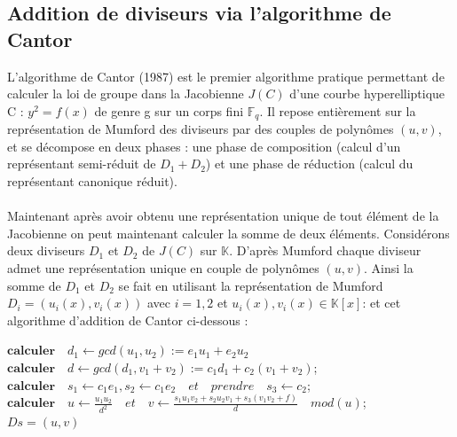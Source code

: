 \documentclass[12pt,a4paper]{article}
\begin{document}
	\subsection{Addition de diviseurs via l'algorithme de Cantor}
	L'algorithme de Cantor (1987) est le premier algorithme pratique permettant
	de calculer la loi de groupe dans la Jacobienne $J(C)$ d'une courbe hyperelliptique C :
	$y^2 = f(x)$ de genre g sur un corps fini $\mathbb{F}_q$. Il repose entièrement sur la représentation
	de Mumford des diviseurs par des couples de polynômes $(u, v)$, et se décompose en
	deux phases : une phase de composition (calcul d'un représentant semi-réduit de
	$D_1 + D_2$) et une phase de réduction (calcul du représentant canonique réduit).
	
	\paragraph*{}
	Maintenant après avoir obtenu une représentation unique de tout élément de la Jacobienne on peut maintenant calculer la somme de deux éléments.
	Considérons deux diviseurs $D_1$ et $D_2$ de $J(C)$ sur $\mathbb{K}$. D'après Mumford chaque diviseur admet une représentation unique en couple de polynômes $(u,v)$.  
	Ainsi la somme de $D_1$ et $D_2$ se fait en utilisant la représentation de Mumford $D_i = (u_i(x),v_i(x))$ avec $i=1,2$ et $u_i(x), v_i(x) \in \mathbb{K}[x]$: et cet algorithme d'addition de Cantor ci-dessous :
	\vspace{0.5cm}
	
	
	\begin{algorithm}[H] 
		\caption{Algorithme d'addition de Cantor}
		\label{alg:cantor}
			
		$\textbf{calculer}\quad d_1 \leftarrow gcd(u_1,u_2):= e_1u_1 + e_2u_2$\;
		$\textbf{calculer}\quad d \leftarrow gcd(d_1,v_1 + v_2):=c_1d_1 +c_2(v_1+v_2)$;\\
		$\textbf{calculer}\quad s_1 \leftarrow c_1e_1, s_2 \leftarrow c_1e_2 \quad et\quad prendre\quad s_3 \leftarrow c_2$;\\
		$\textbf{calculer}\quad u \leftarrow \frac{u_1u_2}{d^2}\quad et \quad v \leftarrow \frac{s_1u_1v_2 + s_2u_2v_1 + s_3(v_1v_2+f)}{d}\quad mod(u) $;\\
		\Return $Ds =(u,v)$\;
	\end{algorithm}
	\vspace{0.6cm}
\end{document}
